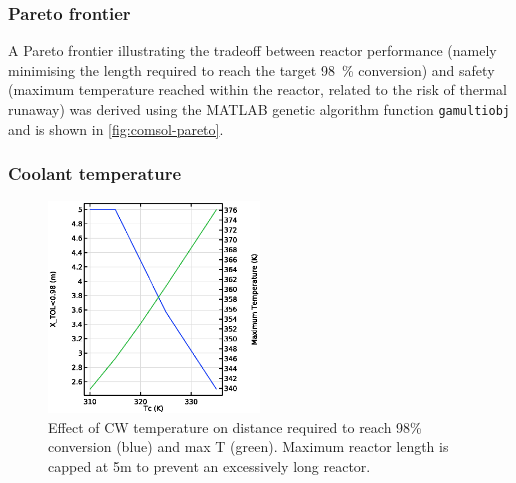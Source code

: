 \subsubsection{Pareto frontier}

A Pareto frontier illustrating the tradeoff between reactor performance (namely minimising the length required to reach the target \SI{98}{\percent} conversion) and safety (maximum temperature reached within the reactor, related to the risk of thermal runaway) was derived using the MATLAB genetic algorithm function \texttt{gamultiobj} and is shown in \cref{fig:comsol-pareto}.

\subsubsection{Coolant temperature}
\begin{figure}
    \vspace{-\intextsep}
    \includegraphics[width=0.5\textwidth]{figures/S4-CW-X-T.eps}
    \caption{Effect of CW temperature on distance required to reach 98\% conversion (blue) and max T (green). Maximum reactor length is capped at 5m to prevent an excessively long reactor.}
    \label{fig:comsol-S4-CW-X-T}
\end{figure}
